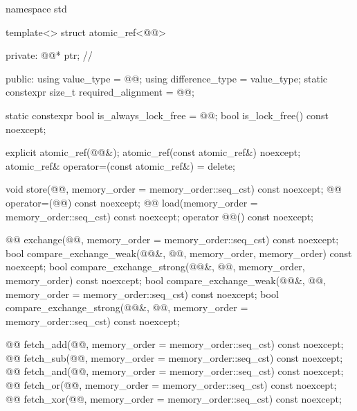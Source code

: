 \begin{codeblock}
namespace std {
  template<> struct atomic_ref<@@> {
  private:
    @@* ptr;         // \expos

  public:
    using value_type = @@;
    using difference_type = value_type;
    static constexpr size_t required_alignment = @@;

    static constexpr bool is_always_lock_free = @@;
    bool is_lock_free() const noexcept;

    explicit atomic_ref(@@&);
    atomic_ref(const atomic_ref&) noexcept;
    atomic_ref& operator=(const atomic_ref&) = delete;

    void store(@@, memory_order = memory_order::seq_cst) const noexcept;
    @@ operator=(@@) const noexcept;
    @@ load(memory_order = memory_order::seq_cst) const noexcept;
    operator @@() const noexcept;

    @@ exchange(@@,
                           memory_order = memory_order::seq_cst) const noexcept;
    bool compare_exchange_weak(@@&, @@,
                               memory_order, memory_order) const noexcept;
    bool compare_exchange_strong(@@&, @@,
                                 memory_order, memory_order) const noexcept;
    bool compare_exchange_weak(@@&, @@,
                               memory_order = memory_order::seq_cst) const noexcept;
    bool compare_exchange_strong(@@&, @@,
                                 memory_order = memory_order::seq_cst) const noexcept;

    @@ fetch_add(@@,
                            memory_order = memory_order::seq_cst) const noexcept;
    @@ fetch_sub(@@,
                            memory_order = memory_order::seq_cst) const noexcept;
    @@ fetch_and(@@,
                            memory_order = memory_order::seq_cst) const noexcept;
    @@ fetch_or(@@,
                            memory_order = memory_order::seq_cst) const noexcept;
    @@ fetch_xor(@@,
                            memory_order = memory_order::seq_cst) const noexcept;

}}
\end{codeblock}
